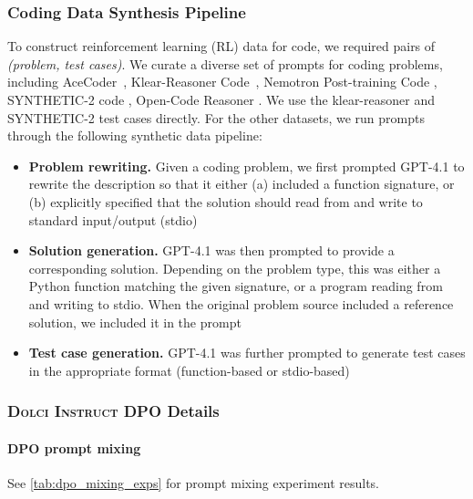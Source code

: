 \documentclass[table]{ai2style/ai2}
\newcommand{\dolciinstructdpo}{\textsc{Dolci Instruct DPO}\xspace}
\begin{document}
{{\subsubsection{Coding Data Synthesis Pipeline}
\label{appx:code-data}

To construct reinforcement learning (RL) data for code, we required pairs of \emph{(problem, test cases)}. We curate a diverse set of prompts for coding problems, including AceCoder~\citep{zeng2025acecoder}, Klear-Reasoner Code~\citep{su2025klear}, Nemotron Post-training Code \citep{nvidia2025nemotron_post_training_dataset}, SYNTHETIC-2 code \citep{primeintellect2025synthetic2}, Open-Code Reasoner \citep{ahmad2025opencodereasoning}. We use the klear-reasoner and SYNTHETIC-2 test cases directly.  For the other datasets, we run prompts through the following synthetic data pipeline:
\begin{itemize}[leftmargin=2.5em]
     \item {\bf Problem rewriting.} Given a coding problem, we first prompted GPT-4.1 to rewrite the description so that it either (a) included a function signature, or (b) explicitly specified that the solution should read from and write to standard input/output (stdio)
     \item {\bf Solution generation.} GPT-4.1 was then prompted to provide a corresponding solution. Depending on the problem type, this was either a Python function matching the given signature, or a program reading from and writing to stdio. When the original problem source included a reference solution, we included it in the prompt
     \item {\bf Test case generation.} GPT-4.1 was further prompted to generate test cases in the appropriate format (function-based or stdio-based)
 \end{itemize}

\subsubsection{\dolciinstructdpo Details}
\paragraph{DPO prompt mixing} See \autoref{tab:dpo_mixing_exps} for prompt mixing experiment results.

}}
\end{document}
